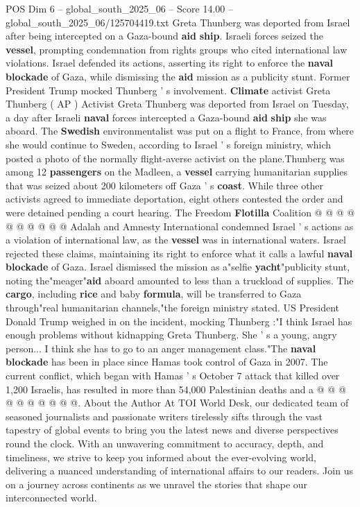\begin{textsample}{POS Dim 6 – global\_south\_2025\_06 – Score 14.00 – global\_south\_2025\_06/125704419.txt}  \label{ex:f6_pos_015}
Greta Thunberg was deported from Israel after being intercepted on a Gaza-bound \textbf{aid} \textbf{ship}.
Israeli forces seized the \textbf{vessel}, prompting condemnation from rights groups who cited international law violations.
Israel defended its actions, asserting its right to enforce the \textbf{naval} \textbf{blockade} of Gaza, while dismissing the \textbf{aid} mission as a publicity stunt.
Former President Trump mocked Thunberg ' s involvement. \textbf{Climate} activist Greta Thunberg ( AP ) Activist Greta Thunberg was deported from Israel on Tuesday, a day after Israeli \textbf{naval} forces intercepted a Gaza-bound \textbf{aid} \textbf{ship} she was aboard.
The \textbf{Swedish} environmentalist was put on a flight to France, from where she would continue to Sweden, according to Israel ' s foreign ministry, which posted a photo of the normally flight-averse activist on the plane.Thunberg was among 12 \textbf{passengers} on the Madleen, a \textbf{vessel} carrying humanitarian supplies that was seized about 200 kilometers off Gaza ' s \textbf{coast}.
While three other activists agreed to immediate deportation, eight others contested the order and were detained pending a court hearing.
The Freedom \textbf{Flotilla} Coalition @ @ @ @ @ @ @ @ @ @ Adalah and Amnesty International condemned Israel ' s actions as a violation of international law, as the \textbf{vessel} was in international waters.
Israel rejected these claims, maintaining its right to enforce what it calls a lawful \textbf{naval} \textbf{blockade} of Gaza.
Israel dismissed the mission as a"selfie \textbf{yacht}"publicity stunt, noting the"meager"\textbf{aid} aboard amounted to less than a truckload of supplies.
The \textbf{cargo}, including \textbf{rice} and baby \textbf{formula}, will be transferred to Gaza through"real humanitarian channels,"the foreign ministry stated.
US President Donald Trump weighed in on the incident, mocking Thunberg :"I think Israel has enough problems without kidnapping Greta Thunberg.
She ' s a young, angry person...
I think she has to go to an anger management class."The \textbf{naval} \textbf{blockade} has been in place since Hamas took control of Gaza in 2007.
The current conflict, which began with Hamas ' s October 7 attack that killed over 1,200 Israelis, has resulted in more than 54,000 Palestinian deaths and a @ @ @ @ @ @ @ @ @ @.
About the Author At TOI World Desk, our dedicated team of seasoned journalists and passionate writers tirelessly sifts through the vast tapestry of global events to bring you the latest news and diverse perspectives round the clock.
With an unwavering commitment to accuracy, depth, and timeliness, we strive to keep you informed about the ever-evolving world, delivering a nuanced understanding of international affairs to our readers.
Join us on a journey across continents as we unravel the stories that shape our interconnected world.

\end{textsample}
